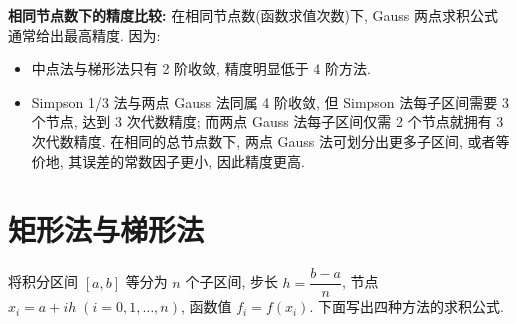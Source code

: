 \documentclass[12pt,a4paper]{ctexart}
\begin{document}
\textbf{相同节点数下的精度比较: }  
在相同节点数(函数求值次数)下, Gauss 两点求积公式通常给出最高精度. 因为: 
\begin{itemize}
    \item 中点法与梯形法只有 2 阶收敛, 精度明显低于 4 阶方法. 
    \item Simpson 1/3 法与两点 Gauss 法同属 4 阶收敛, 但 Simpson 法每子区间需要 3 个节点, 达到 3 次代数精度; 而两点 Gauss 法每子区间仅需 2 个节点就拥有 3 次代数精度. 在相同的总节点数下, 两点 Gauss 法可划分出更多子区间, 或者等价地, 其误差的常数因子更小, 因此精度更高. 
\end{itemize}
\section{矩形法与梯形法}
将积分区间 $[a, b]$ 等分为 $n$ 个子区间, 步长 $h = \dfrac{b-a}{n}$, 节点 $x_i = a + i h \;(i=0,1,\dots,n)$, 函数值 $f_i = f(x_i)$. 下面写出四种方法的求积公式.
\end{document}
